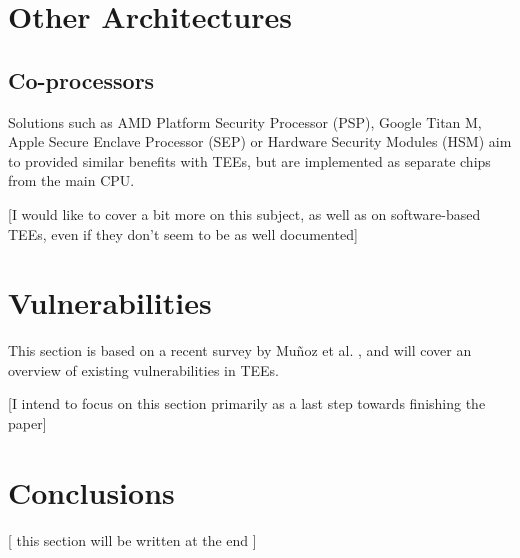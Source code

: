 \documentclass[runningheads,a4paper]{uwsese}
\begin{document}
\section{Other Architectures}


\subsection{Co-processors}

Solutions such as AMD Platform Security Processor (PSP), Google Titan M, Apple
Secure Enclave Processor (SEP) or Hardware Security Modules (HSM) aim to
provided similar benefits with TEEs, but are implemented as separate chips from
the main CPU.

[I would like to cover a bit more on this subject, as well as on software-based TEEs,
even if they don't seem to be as well documented]


\section{Vulnerabilities}

This section is based on a recent survey by Muñoz et al. \cite{tee_in_securities},
and will cover an overview of existing vulnerabilities in TEEs.

[I intend to focus on this section primarily as a last step towards finishing the paper]

\section{Conclusions}

[ this section will be written at the end ]


\end{document}
